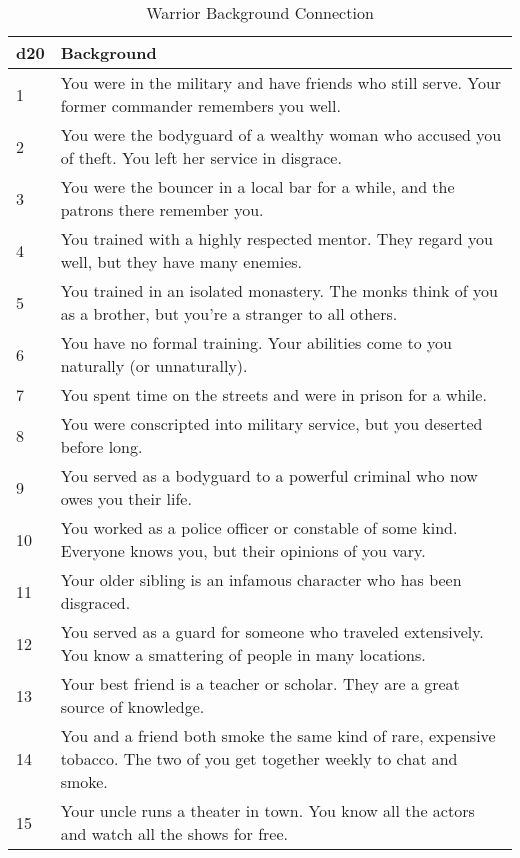 \begin{table}
\centering

\caption{Warrior Background Connection}
\label{tab:Warrior Background Connection}

\begin{tabularx}{\textwidth}{| p{} | p{} |}
\hline
\textbf{d20} & \textbf{Background} \\
\hline
1 & You were in the military and have friends who still serve. Your former commander remembers you well.\\ \hline
2 & You were the bodyguard of a wealthy woman who accused you of theft. You left her service in disgrace.  \\ \hline
3 & You were the bouncer in a local bar for a while, and the patrons there remember you.  \\ \hline
4 & You trained with a highly respected mentor. They regard you well, but they have many enemies.  \\ \hline
5 & You trained in an isolated monastery. The monks think of you as a brother, but you’re a stranger to all others.  \\ \hline
6 & You have no formal training. Your abilities come to you naturally (or unnaturally).  \\ \hline
7 & You spent time on the streets and were in prison for a while. \\ \hline
8 & You were conscripted into military service, but you deserted before long.  \\ \hline
9 & You served as a bodyguard to a powerful criminal who now owes you their life.  \\ \hline
10 & You worked as a police officer or constable of some kind. Everyone knows you, but their opinions of you vary.  \\ \hline
11 & Your older sibling is an infamous character who has been disgraced. \\ \hline
12 & You served as a guard for someone who traveled extensively. You know a smattering of people in many locations. \\ \hline
13 & Your best friend is a teacher or scholar. They are a great source of knowledge. \\ \hline
14 & You and a friend both smoke the same kind of rare, expensive tobacco. The two of you get together weekly to chat and smoke. \\ \hline
15 & Your uncle runs a theater in town. You know all the actors and watch all the shows for free. \\ \hline

\end{tabularx}
\end{table}
